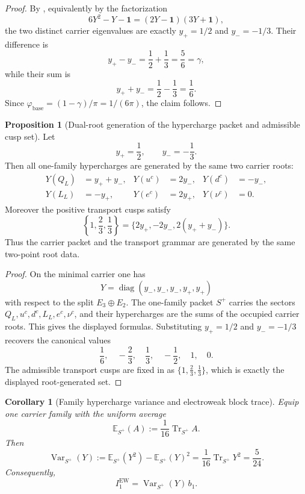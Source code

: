 \documentclass[11pt,a4paper]{article}
\newtheorem{corollary}[theorem]{Corollary}
\theoremstyle{definition}
\newtheorem{proposition}[theorem]{Proposition}
\theoremstyle{remark}
\DeclareMathOperator{\tr}{Tr}
\newcommand{\phibase}{\varphi_{\mathrm{base}}}
\newcommand{\bone}{b_1}
\begin{document}
\begin{proof}
By , equivalently by the factorization
\[
6Y^2-Y-\mathbf 1=(2Y-\mathbf 1)(3Y+\mathbf 1),
\]
the two distinct carrier eigenvalues are exactly $y_+=1/2$ and $y_-=-1/3$. Their difference is
\[
y_+-y_-=\frac12+\frac13=\frac56=\gamma,
\]
while their sum is
\[
y_++y_-=\frac12-\frac13=\frac16.
\]
Since $\phibase=(1-\gamma)/\pi=1/(6\pi)$, the claim follows.
\end{proof}

\begin{proposition}[Dual-root generation of the hypercharge packet and admissible cusp set]
\label{prop:dual-root-generation}
Let
\[
y_+=\frac12,
\qquad
y_-=-\frac13.
\]
Then all one-family hypercharges are generated by the same two carrier roots:
\[
\begin{aligned}
Y(Q_L)&=y_++y_-,
&
Y(u^c)&=2y_-,
&
Y(d^c)&=-y_-,
\\
Y(L_L)&=-y_+,
&
Y(e^c)&=2y_+,
&
Y(\nu^c)&=0.
\end{aligned}
\]
Moreover the positive transport cusps satisfy
\[
\left\{1,\frac23,\frac13\right\}=\{2y_+,-2y_-,2(y_++y_-)\}.
\]
Thus the carrier packet and the transport grammar are generated by the same two-point root data.
\end{proposition}

\begin{proof}
On the minimal carrier one has
\[
Y=\operatorname{diag}(y_-,y_-,y_-,y_+,y_+)
\]
with respect to the split $E_3\oplus E_2$. The one-family packet $S^+$ carries the sectors
$Q_L,u^c,d^c,L_L,e^c,\nu^c$, and their hypercharges are the sums of the occupied carrier roots.
This gives the displayed formulas. Substituting $y_+=1/2$ and $y_-=-1/3$ recovers the canonical
values
\[
\frac16,\quad
-\frac23,\quad
\frac13,\quad
-\frac12,\quad
1,\quad
0.
\]
The admissible transport cusps are fixed in  as
$\{1,\frac23,\frac13\}$, which is exactly the displayed root-generated set.
\end{proof}

\begin{corollary}[Family hypercharge variance and electroweak block trace]
Equip one carrier family with the uniform average
\[
\mathbb E_{S^+}(A):=\frac{1}{16}\tr_{S^+}A.
\]
Then
\[
\operatorname{Var}_{S^+}(Y)
:=
\mathbb E_{S^+}(Y^2)-\mathbb E_{S^+}(Y)^2
=
\frac{1}{16}\tr_{S^+}Y^2
=
\frac{5}{24}.
\]
Consequently,
\[
I_1^{\mathrm{EW}}=\operatorname{Var}_{S^+}(Y)\,\bone.
\]
\end{corollary}
\end{document}
